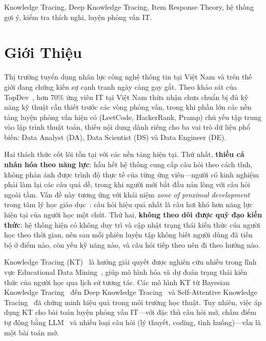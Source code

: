 \documentclass[conference]{IEEEtran}
\begin{document}
\begin{IEEEkeywords}
Knowledge Tracing, Deep Knowledge Tracing, Item Response Theory, hệ thống gợi ý, kiểm tra thích nghi, luyện phỏng vấn IT.
\end{IEEEkeywords}

\section{Giới Thiệu}
\label{sec:intro}

Thị trường tuyển dụng nhân lực công nghệ thông tin tại Việt Nam và trên thế giới đang chứng kiến sự cạnh tranh ngày càng gay gắt. Theo khảo sát của TopDev~\cite{topdev2024}, hơn 70\% ứng viên IT tại Việt Nam thừa nhận chưa chuẩn bị đủ kỹ năng kỹ thuật cần thiết trước các vòng phỏng vấn, trong khi phần lớn các nền tảng luyện phỏng vấn hiện có (LeetCode, HackerRank, Pramp) chủ yếu tập trung vào lập trình thuật toán, thiếu nội dung dành riêng cho ba vai trò dữ liệu phổ biến: Data Analyst (DA), Data Scientist (DS) và Data Engineer (DE).

Hai thách thức cốt lõi tồn tại với các nền tảng hiện tại. Thứ nhất, \textbf{thiếu cá nhân hóa theo năng lực}: hầu hết hệ thống cung cấp câu hỏi theo cách tĩnh, không phản ánh được trình độ thực tế của từng ứng viên---người có kinh nghiệm phải làm lại các câu quá dễ, trong khi người mới bắt đầu nản lòng với câu hỏi ngoài tầm. Vấn đề này tương ứng với khái niệm \textit{zone of proximal development} trong tâm lý học giáo dục~\cite{vygotsky1978mind}: câu hỏi hiệu quả nhất là câu hơi khó hơn năng lực hiện tại của người học một chút. Thứ hai, \textbf{không theo dõi được quỹ đạo kiến thức}: hệ thống hiện có không duy trì và cập nhật trạng thái kiến thức của người học theo thời gian, nên sau mỗi phiên luyện tập không biết người dùng đã tiến bộ ở điểm nào, còn yếu kỹ năng nào, và câu hỏi tiếp theo nên đi theo hướng nào.

Knowledge Tracing (KT)~\cite{corbett1994knowledge} là hướng giải quyết được nghiên cứu nhiều trong lĩnh vực Educational Data Mining~\cite{romero2010educational,baker2010data}, giúp mô hình hóa và dự đoán trạng thái kiến thức của người học qua lịch sử tương tác. Các mô hình KT từ Bayesian Knowledge Tracing~\cite{corbett1994knowledge} đến Deep Knowledge Tracing~\cite{piech2015deep} và Self-Attentive Knowledge Tracing~\cite{pandey2019self} đã chứng minh hiệu quả trong môi trường học thuật. Tuy nhiên, việc áp dụng KT cho bài toán luyện phỏng vấn IT---với đặc thù câu hỏi mở, chấm điểm tự động bằng LLM~\cite{team2023gemini} và nhiều loại câu hỏi (lý thuyết, coding, tình huống)---vẫn là một bài toán mở.
\end{document}

